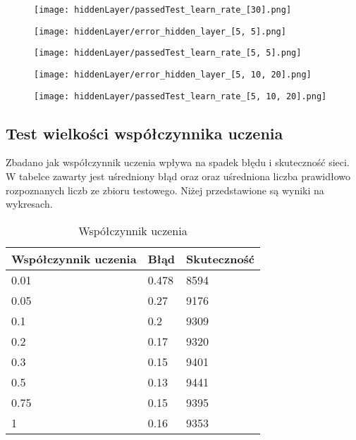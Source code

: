 \documentclass{article}
\begin{document}
\begin{figure}[]
  \centering
  \texttt{[image: hiddenLayer/passedTest\_learn\_rate\_[30].png]}
\end{figure}

\begin{figure}[]
  \centering
  \texttt{[image: hiddenLayer/error\_hidden\_layer\_[5, 5].png]}
\end{figure}

\begin{figure}[]
  \centering
  \texttt{[image: hiddenLayer/passedTest\_learn\_rate\_[5, 5].png]}
\end{figure}

\begin{figure}[]
  \centering
  \texttt{[image: hiddenLayer/error\_hidden\_layer\_[5, 10, 20].png]}
\end{figure}

\begin{figure}[]
  \centering
  \texttt{[image: hiddenLayer/passedTest\_learn\_rate\_[5, 10, 20].png]}
\end{figure}


\newpage
\subsection{Test wielkości współczynnika uczenia}

Zbadano jak współczynnik uczenia wpływa na spadek błędu i skuteczność sieci. W tabelce zawarty jest uśredniony błąd oraz oraz uśredniona liczba prawidłowo rozpoznanych
liczb ze zbioru testowego. Niżej przedstawione są wyniki na wykresach.

\begin{table}[h]
  \centering
    
  \bgroup
  \def\arraystretch{1.3}
  \begin{tabular}{|l|l|l|}
  \hline
  Współczynnik uczenia & Błąd & Skuteczność \\ \hline
  {0.01} & 0.478 & 8594 \\ \hline
  {0.05} & 0.27 & 9176 \\ \hline
  {0.1} & 0.2 & 9309 \\ \hline
  {0.2} & 0.17 & 9320 \\ \hline
  {0.3} & 0.15 & 9401 \\ \hline
  {0.5} & 0.13 & 9441 \\ \hline
  {0.75} & 0.15 & 9395 \\ \hline
  {1} & 0.16 & 9353 \\ \hline
  \end{tabular}
  \egroup
  \vspace{10pt}
  \caption{Współczynnik uczenia}
\end{table}
\end{document}
